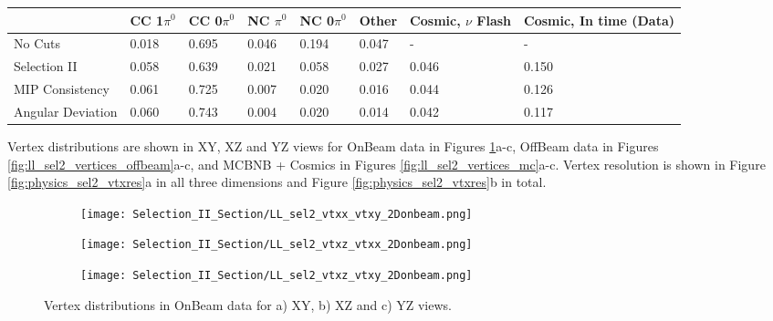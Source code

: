 \documentclass{article}
\begin{document}
\begin{table*}
\centering
{}
 \begin{tabular}{| l | l | l |l|l|l|l|l|}
 \hline
 & CC 1$\pi^0$ & CC 0$\pi^0$ & NC $\pi^0$ & NC 0$\pi^0$ & Other & Cosmic, $\nu$ Flash & Cosmic, In time (Data) \\ [0.1ex] \hline
No Cuts & 0.018 & 0.695 & 0.046 & 0.194 & 0.047 & - & -\\ 
Selection II & 0.058 & 0.639 & 0.021 & 0.058 & 0.027 & 0.046 & 0.150 \\ \hline
MIP Consistency & 0.061 & 0.725 & 0.007 & 0.020 & 0.016 & 0.044 & 0.126 \\ 
Angular Deviation & 0.060 & 0.743 & 0.004 & 0.020 & 0.014 & 0.042 & 0.117 \\ \hline
\end{tabular}
\end{table*}

Vertex distributions are shown in XY, XZ and YZ views for OnBeam data in Figures \ref{fig:ll_sel2_vertices_onbeam}a-c, OffBeam data in Figures \ref{fig:ll_sel2_vertices_offbeam}a-c, and MCBNB + Cosmics in Figures \ref{fig:ll_sel2_vertices_mc}a-c.  Vertex resolution is shown in Figure \ref{fig:physics_sel2_vtxres}a in all three dimensions and Figure \ref{fig:physics_sel2_vtxres}b in total. 

\begin{figure}[h!]
\centering
  \begin{subfigure}[t]{0.26\textwidth}
    \centering
\texttt{[image: Selection\_II\_Section/LL\_sel2\_vtxx\_vtxy\_2Donbeam.png]}
    \caption{ }
  \end{subfigure} 
  \hspace{10 mm}
  \begin{subfigure}[t]{0.26\textwidth}
    \centering
\texttt{[image: Selection\_II\_Section/LL\_sel2\_vtxz\_vtxx\_2Donbeam.png]}
    \caption{ }
  \end{subfigure} 
  \hspace{10 mm}
  \begin{subfigure}[t]{0.26\textwidth}
    \centering
\texttt{[image: Selection\_II\_Section/LL\_sel2\_vtxz\_vtxy\_2Donbeam.png]}
    \caption{ }
  \end{subfigure} 

\caption{ Vertex distributions in OnBeam data for a) XY, b) XZ and c) YZ views. }
\label{fig:ll_sel2_vertices_onbeam}
\end{figure}
\end{document}
